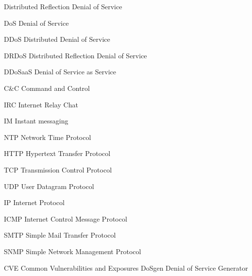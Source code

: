 \begin{seznamzkratek}{Distributed Reflection Denial of Service}

		{DoS}
		{Denial of Service}

		{DDoS}
		{Distributed Denial of Service}

		{DRDoS}
		{Distributed Reflection Denial of Service}

		{DDoSaaS}
		{Denial of Service as Service}

		{C\&C} %
		{Command and Control}

		{IRC}
		{Internet Relay Chat}

		{IM}
		{Instant messaging}

		{NTP}
		{Network Time Protocol}

		{HTTP}
		{Hypertext Transfer Protocol}

		{TCP}
		{Transmission Control Protocol}

		{UDP}
		{User Datagram Protocol}

		{IP}
		{Internet Protocol}

		{ICMP}
		{Internet Control Message Protocol}

		{SMTP}
		{Simple Mail Transfer Protocol}
		
		{SNMP}
		{Simple Network Management Protocol}
	
		{CVE}
		{Common Vulnerabilities and Exposures}
		{DoSgen}
		{Denial of Service Generator}
\end{seznamzkratek}
